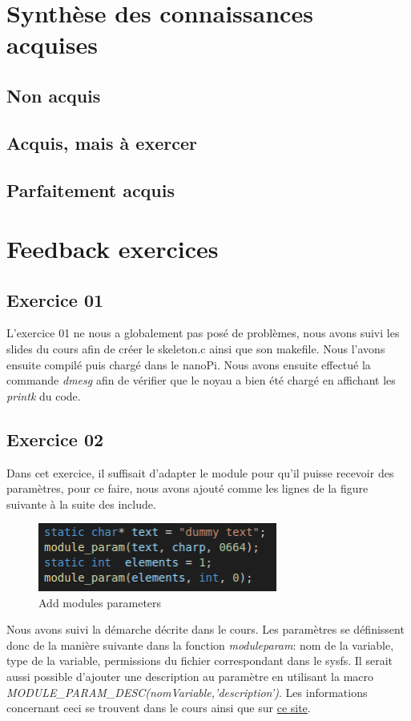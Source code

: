 \documentclass{ReportTemplate}
\begin{document}
\section{Synthèse des connaissances acquises}
\subsection{Non acquis}

\subsection{Acquis, mais à exercer}

\subsection{Parfaitement acquis}
\section{Feedback exercices}
\subsection{Exercice 01}
L'exercice 01 ne nous a globalement pas posé de problèmes, nous avons suivi les
slides du cours afin de créer le skeleton.c ainsi que son makefile. Nous l'avons
ensuite compilé puis chargé dans le nanoPi. Nous avons ensuite effectué la
commande \textit{dmesg} afin de vérifier que le noyau a bien été chargé en
affichant les \textit{printk} du code.
\subsection{Exercice 02}
Dans cet exercice, il suffisait d'adapter le module pour qu'il puisse recevoir
des paramètres, pour ce faire, nous avons ajouté comme les lignes de la figure
suivante à la suite des include.
\begin{figure}[H]
    \centering
    \includegraphics[width=0.7\textwidth]{imageSources/ModuleParams.png}
    \caption{Add modules parameters}
    \label{fig:ModuleParams}
\end{figure}
Nous avons suivi la démarche décrite dans le cours. Les paramètres se
définissent donc de la manière suivante dans la fonction \textit{moduleparam}: \newline
nom de la variable, type de la variable, permissions du fichier correspondant
dans le sysfs. Il serait aussi possible d'ajouter une description au paramètre
en utilisant la macro \textit{MODULE\_PARAM\_DESC(nomVariable,'description')}. Les
informations concernant ceci se trouvent dans le cours ainsi que sur
\href{https://linuxkernel51.blogspot.com/2011/03/use-of-module-parameters-in-kernel.html}{ce
site}.
\newpage
\end{document}
